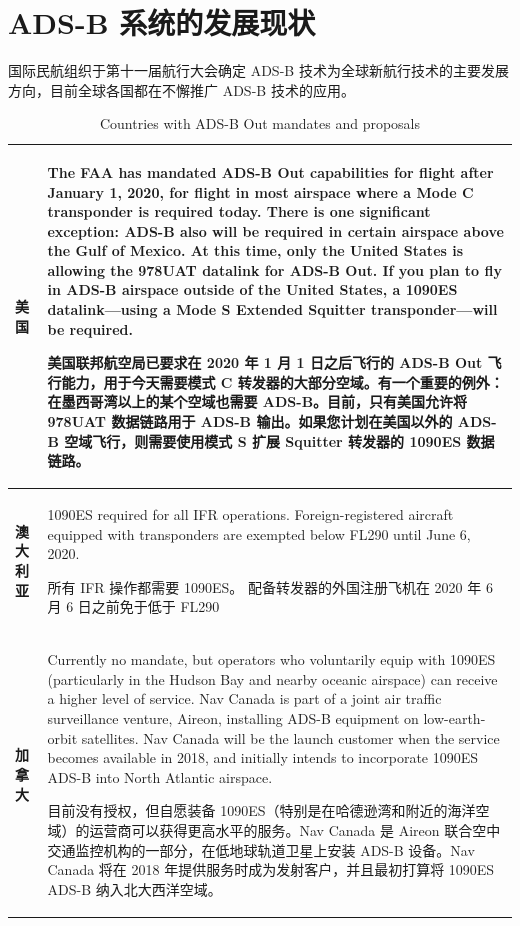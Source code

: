 \section{ADS-B 系统的发展现状}

国际民航组织于第十一届航行大会确定 ADS-B 技术为全球新航行技术的主要发展方向，目前全球各国都在不懈推广 ADS-B 技术的应用。

\renewcommand\arraystretch{1.5}
\begin{table}[htbp]
\centering
\caption{Countries with ADS-B Out mandates and proposals}
\label{tab:Countries_with_ADS-B_Out_mandates_and_proposals}
\begin{tabular}[b]{|p{2cm}<{\raggedleft}|p{13cm}<{\raggedright}|}
\hline
\textbf{美国} & The FAA has mandated ADS-B Out capabilities for flight after January 1, 2020, for flight in most airspace where a Mode C transponder is required today. There is one significant exception: ADS-B also will be required in certain airspace above the Gulf of Mexico. At this time, only the United States is allowing the 978UAT datalink for ADS-B Out. If you plan to fly in ADS-B airspace outside of the United States, a 1090ES datalink—using a Mode S Extended Squitter transponder—will be required.
\par
美国联邦航空局已要求在 2020 年 1 月 1 日之后飞行的 ADS-B Out 飞行能力，用于今天需要模式 C 转发器的大部分空域。有一个重要的例外：在墨西哥湾以上的某个空域也需要 ADS-B。目前，只有美国允许将 978UAT 数据链路用于 ADS-B 输出。如果您计划在美国以外的 ADS-B 空域飞行，则需要使用模式 S 扩展 Squitter 转发器的 1090ES 数据链路。\\
\hline
\textbf{澳大利亚} & 1090ES required for all IFR operations. Foreign-registered aircraft equipped with transponders are exempted below FL290 until June 6, 2020.
\par
所有 IFR 操作都需要 1090ES。 配备转发器的外国注册飞机在 2020 年 6 月 6 日之前免于低于 FL290  \\
\hline
\textbf{加拿大} & Currently no mandate, but operators who voluntarily equip with 1090ES (particularly in the Hudson Bay and nearby oceanic airspace) can receive a higher level of service. Nav Canada is part of a joint air traffic surveillance venture, Aireon, installing ADS-B equipment on low-earth-orbit satellites. Nav Canada will be the launch customer when the service becomes available in 2018, and initially intends to incorporate 1090ES ADS-B into North Atlantic airspace.
\par
目前没有授权，但自愿装备 1090ES（特别是在哈德逊湾和附近的海洋空域）的运营商可以获得更高水平的服务。Nav Canada 是 Aireon 联合空中交通监控机构的一部分，在低地球轨道卫星上安装 ADS-B 设备。Nav Canada 将在 2018 年提供服务时成为发射客户，并且最初打算将 1090ES ADS-B 纳入北大西洋空域。\\

\end{tabular}
\end{table}
